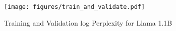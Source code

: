 \begin{figure}[ht]
    \centering
    \vspace{-2.5mm}
    \texttt{[image: figures/train\_and\_validate.pdf]}
    \vspace{-5.5mm}
    \caption{\small{Training and Validation log Perplexity for Llama 1.1B
    }}
    \vspace{-5mm}
    \label{fig:train_loss}
\end{figure}